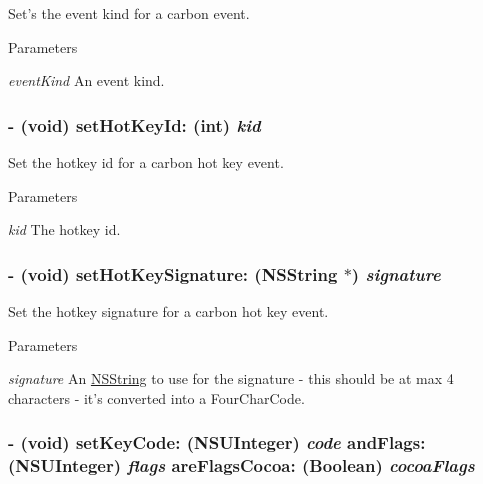 Set's the event kind for a carbon event. 
\begin{DoxyParams}{Parameters}
\item[{\em eventKind}]An event kind. \end{DoxyParams}
\hypertarget{interface_g_d_carbon_event_aa9d6d67191763d051b809abaf50ec6b0}{
\subsubsection[{setHotKeyId:}]{\setlength{\rightskip}{0pt plus 5cm}-\/ (void) setHotKeyId: (int) {\em kid}}}
\label{interface_g_d_carbon_event_aa9d6d67191763d051b809abaf50ec6b0}


Set the hotkey id for a carbon hot key event. 
\begin{DoxyParams}{Parameters}
\item[{\em kid}]The hotkey id. \end{DoxyParams}
\hypertarget{interface_g_d_carbon_event_a06f5898aa490cf71399ea4f62f6b3d73}{
\subsubsection[{setHotKeySignature:}]{\setlength{\rightskip}{0pt plus 5cm}-\/ (void) setHotKeySignature: ({\bf NSString} $\ast$) {\em signature}}}
\label{interface_g_d_carbon_event_a06f5898aa490cf71399ea4f62f6b3d73}


Set the hotkey signature for a carbon hot key event. 
\begin{DoxyParams}{Parameters}
\item[{\em signature}]An \hyperlink{class_n_s_string}{NSString} to use for the signature -\/ this should be at max 4 characters -\/ it's converted into a FourCharCode. \end{DoxyParams}
\hypertarget{interface_g_d_carbon_event_a0140fa16d6e2987aa2437f6e56a8269d}{
\subsubsection[{setKeyCode:andFlags:areFlagsCocoa:}]{\setlength{\rightskip}{0pt plus 5cm}-\/ (void) setKeyCode: (NSUInteger) {\em code}\/ andFlags: (NSUInteger) {\em flags}\/ areFlagsCocoa: (Boolean) {\em cocoaFlags}}}
\label{interface_g_d_carbon_event_a0140fa16d6e2987aa2437f6e56a8269d}


